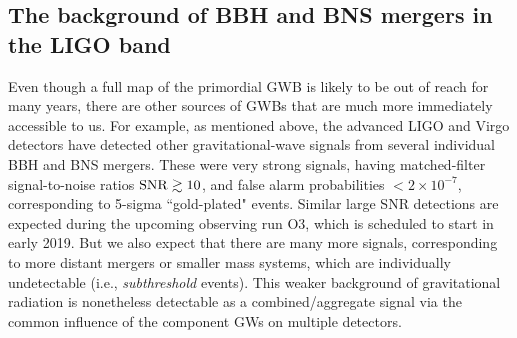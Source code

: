 \subsection{The background of BBH and BNS mergers in the 
LIGO band}
\label{s:BBH-BNS-LIGO}

Even though a full map of the primordial GWB is likely
to be out of reach for many years, there are other
sources of GWBs that are much more immediately accessible
to us.
For example, as mentioned above, the advanced LIGO
and Virgo detectors have detected other 
gravitational-wave signals from several individual BBH 
and BNS mergers.
These were very strong signals, having 
matched-filter signal-to-noise ratios ${\rm SNR}\gtrsim 10$, 
and false alarm probabilities $<2\times 10^{-7}$,
corresponding to 5-sigma ``gold-plated" events.
Similar large SNR detections are expected during the 
upcoming observing run O3, which is scheduled to start in early 2019.
But we also expect that there are many more signals, 
corresponding to more distant mergers or smaller mass systems, 
which are 
individually undetectable (i.e., {\em subthreshold} events).
This weaker background of gravitational radiation is 
nonetheless detectable as a combined/aggregate signal
via the common influence of the component GWs on 
multiple detectors.

